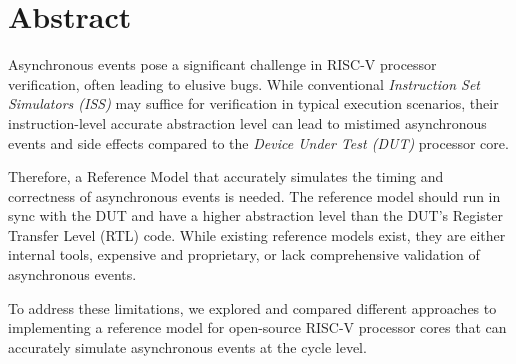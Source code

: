 \chapter*{Abstract}




Asynchronous events pose a significant challenge in RISC-V processor verification, often leading to elusive bugs. While conventional \textit{Instruction Set Simulators (ISS)} may suffice for verification in typical execution scenarios, their instruction-level accurate abstraction level can lead to mistimed asynchronous events and side effects compared to the \textit{Device Under Test (DUT)} processor core.


Therefore, a Reference Model that accurately simulates the timing and correctness of asynchronous events is needed. The reference model should run in sync with the DUT and have a higher abstraction level than the DUT's Register Transfer Level (RTL) code. 
While existing reference models exist, they are either internal tools, expensive and proprietary, or lack comprehensive validation of asynchronous events. 

To address these limitations, we explored and compared different approaches to implementing a reference model for open-source RISC-V processor cores that can accurately simulate asynchronous events at the cycle level. 

